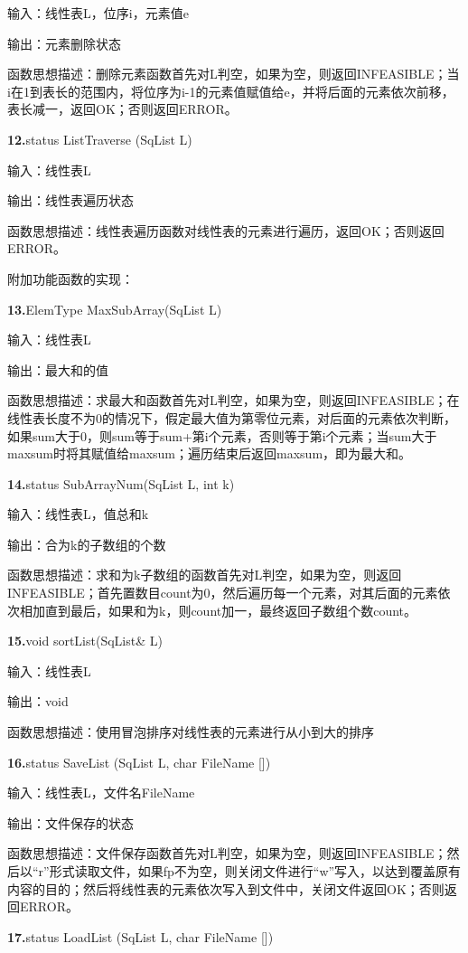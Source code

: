 \documentclass[supercite]{Experimental_Report}
\theoremstyle{definition}
\begin{document}
输入：线性表L，位序i，元素值e

输出：元素删除状态

函数思想描述：删除元素函数首先对L判空，如果为空，则返回INFEASIBLE；当i在1到表长的范围内，将位序为i-1的元素值赋值给e，并将后面的元素依次前移，表长减一，返回OK；否则返回ERROR。

\noindent\textbf{12.}status ListTraverse (SqList L)

输入：线性表L

输出：线性表遍历状态

函数思想描述：线性表遍历函数对线性表的元素进行遍历，返回OK；否则返回ERROR。

附加功能函数的实现：

\noindent\textbf{13.}ElemType MaxSubArray(SqList L)

输入：线性表L

输出：最大和的值

函数思想描述：求最大和函数首先对L判空，如果为空，则返回INFEASIBLE；在线性表长度不为0的情况下，假定最大值为第零位元素，对后面的元素依次判断，如果sum大于0，则sum等于sum+第i个元素，否则等于第i个元素；当sum大于maxsum时将其赋值给maxsum；遍历结束后返回maxsum，即为最大和。

\noindent\textbf{14.}status SubArrayNum(SqList L, int k)

输入：线性表L，值总和k

输出：合为k的子数组的个数

函数思想描述：求和为k子数组的函数首先对L判空，如果为空，则返回INFEASIBLE；首先置数目count为0，然后遍历每一个元素，对其后面的元素依次相加直到最后，如果和为k，则count加一，最终返回子数组个数count。

\noindent\textbf{15.}void sortList(SqList\& L)

输入：线性表L

输出：void

函数思想描述：使用冒泡排序对线性表的元素进行从小到大的排序

\noindent\textbf{16.}status SaveList (SqList L, char FileName [])

输入：线性表L，文件名FileName

输出：文件保存的状态

函数思想描述：文件保存函数首先对L判空，如果为空，则返回INFEASIBLE；然后以“r”形式读取文件，如果fp不为空，则关闭文件进行“w”写入，以达到覆盖原有内容的目的；然后将线性表的元素依次写入到文件中，关闭文件返回OK；否则返回ERROR。

\noindent\textbf{17.}status LoadList (SqList L, char FileName [])
\end{document}
